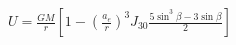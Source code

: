 \documentclass[10pt]{article}
\begin{document}
\begin{align*}U = \frac{G M}{r} \left[ 1 - \left( \frac{a_{e}}{r} \right)^3 J_{30} \frac{ 5 \sin^3 \beta - 3 \sin \beta}{2} \right] \end{align*}
\end{document}
